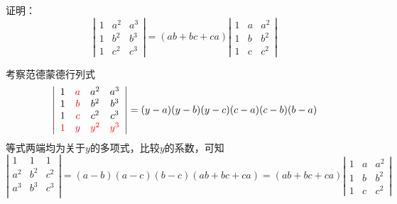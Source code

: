 \begin{frame}
  \begin{footnotesize}
    \begin{exampleblock}{22}
      证明：
      $$
      \left|
      \begin{array}{ccc}
        1&a^2&a^3\\
        1&b^2&b^3\\
        1&c^2&c^3
      \end{array}
      \right| = (ab+bc+ca)\left|
      \begin{array}{ccc}
        1&a&a^2\\
        1&b&b^2\\
        1&c&c^2
      \end{array}
      \right|
      $$
    \end{exampleblock}
    \pause
    \proofname
    考察范德蒙德行列式
    $$
    \left|
    \begin{array}{cccc}      
      1&\textcolor{red}{a}&a^2&a^3\\
      1&\textcolor{red}{b}&b^2&b^3\\
      1&\textcolor{red}{c}&c^2&c^3\\
      \textcolor{red}{1}&\textcolor{purple}{y}&\textcolor{red}{y^2}&\textcolor{red}{y^3}
    \end{array}
    \right|
    = (y-a)(y-b)(y-c)(c-a)(c-b)(b-a)
    $$
    \pause
    等式两端均为关于$y$的多项式，比较$y$的系数，可知
    $$
    \left|
    \begin{array}{cccc}
      1   &   1   &   1  \\ 
      a^2 &   b^2 &   c^2  \\
      a^3 &   b^3 &   c^3\\
    \end{array}
    \right| = (a-b)(a-c)(b-c)(ab+bc+ca) = (ab+bc+ca)\left|
    \begin{array}{ccc}
      1&a&a^2\\
      1&b&b^2\\
      1&c&c^2
    \end{array}
    \right|
    $$

  \end{footnotesize}
\end{frame}


